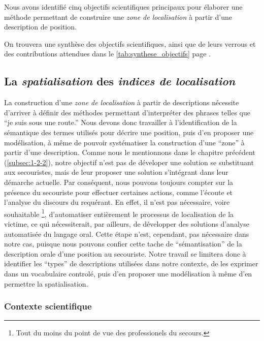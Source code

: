 Nous avons identifié cinq objectifs scientifiques principaux pour
élaborer une méthode permettant de construire une \emph{zone de
  localisation} à partir d'une description de position.

On trouvera une synthèse des objectifs scientifiques, ainsi que de
leurs verrous et des contributions attendues dans le
\autoref{tab:synthese_objectifs} page
\pageref{tab:synthese_objectifs}.

\subsection{La \emph{spatialisation} des \emph{indices de
    localisation}}
\label{subsec:2-1-1}

La construction d'une \emph{zone de localisation} à partir de
descriptions nécessite d'arriver à définir des méthodes permettant
d'interpréter des phrases telles que \enquote{je suis sous une route.}
Nous devons donc travailler à l'identification de la sémantique des
termes utilisés pour décrire une position, puis d'en proposer une
modélisation, à même de pouvoir systématiser la construction d'une
\enquote{zone} à partir d'une description. Comme nous le mentionnons
dans le chapitre précédent (\ref{subsec:1-2-2}), notre objectif n'est
pas de déveloper une solution se substituant aux secouristes, mais de
leur proposer une solution s'intégrant dans leur démarche
actuelle. Par conséquent, nous pouvons toujours compter sur la
présence du secouriste pour effectuer certaines actions, comme
l'écoute et l'analyse du discours du requérant. En effet, il n'est pas
nécessaire, voire souhaitable \footnote{Tout du moins du point de vue
  des professionels du secours.}, d'automatiser entièrement le
processus de localisation de la victime, ce qui nécessiterait, par
ailleurs, de développer des solutions d'analyse automatisée du langage
oral. Cette étape n'est, cependant, pas nécessaire dans notre cas,
puisque nous pouvons confier cette tache de \enquote{sémantisation} de
la description orale d'une position au secouriste. Notre travail se
limitera donc à identifier les \enquote{types} de descriptions
utilisées dans notre contexte, de les exprimer dans un vocabulaire
controlé, puis d'en proposer une modélisation à même d'en permettre la
spatialisation.

\subsubsection{Contexte scientifique}

